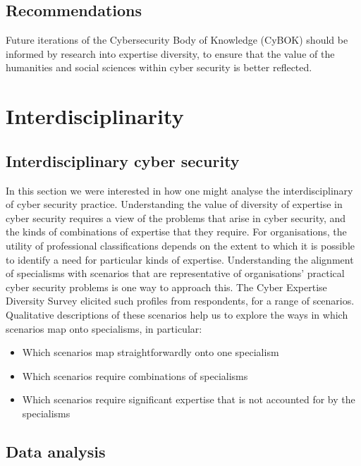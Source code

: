 \documentclass[
  a4paper,
]{book}
\begin{document}
\section{Recommendations}\label{recommendations-2}

Future iterations of the Cybersecurity Body of Knowledge (CyBOK) should
be informed by research into expertise diversity, to ensure that the
value of the humanities and social sciences within cyber security is
better reflected.


\chapter{Interdisciplinarity}\label{interdisciplinarity}

\section{Interdisciplinary cyber
security}\label{interdisciplinary-cyber-security}

In this section we were interested in how one might analyse the
interdisciplinary of cyber security practice. Understanding the value of
diversity of expertise in cyber security requires a view of the problems
that arise in cyber security, and the kinds of combinations of expertise
that they require. For organisations, the utility of professional
classifications depends on the extent to which it is possible to
identify a need for particular kinds of expertise. Understanding the
alignment of specialisms with scenarios that are representative of
organisations' practical cyber security problems is one way to approach
this. The Cyber Expertise Diversity Survey elicited such profiles from
respondents, for a range of scenarios. Qualitative descriptions of these
scenarios help us to explore the ways in which scenarios map onto
specialisms, in particular:

\begin{itemize}
\item
  Which scenarios map straightforwardly onto one specialism
\item
  Which scenarios require combinations of specialisms
\item
  Which scenarios require significant expertise that is not accounted
  for by the specialisms
\end{itemize}

\section{Data analysis}\label{data-analysis-2}
\end{document}
